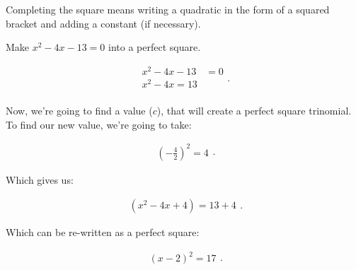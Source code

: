 \label{les_2_unit_4:completing_the_square}

\begin{definition}
  \label{def:completing_the_square}

  Completing the square means writing a quadratic in the form of a squared
  bracket and adding a constant (if necessary).
\end{definition}

\begin{example}
  \label{exm:completing_the_square}

  Make $x^{2} - 4x - 13 = 0$ into a perfect square.

  \begin{equation}
    \label{spt:completing_the_square}
    \begin{split}
      x^{2} - 4x - 13 &= 0 \\
      x^{2} - 4x = 13 \\
    \end{split}
  .\end{equation}

  Now, we're going to find a value ($c$), that will create a perfect square
  trinomial. To find our new value, we're going to take:

  \begin{equation}
    \label{spt:finding_our_b}
    \begin{split}
      \left(-\frac{4}{2}\right)^{2} = 4
    \end{split}
  .\end{equation}

  Which gives us:

  \begin{equation}
    \label{spt:completing_the_square_2}
    \begin{split}
      (x^{2} - 4x + 4) = 13 + 4
    \end{split}
  .\end{equation}

  Which can be re-written as a perfect square:

  \begin{equation}
    \label{spt:completing_the_square_3}
    \begin{split}
      (x - 2)^{2} = 17
    \end{split}
  .\end{equation}
\end{example}

\newpage
